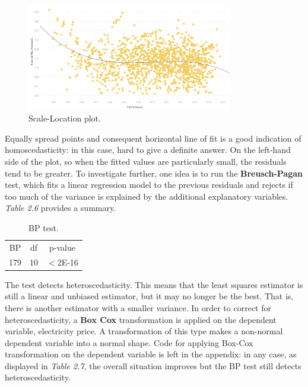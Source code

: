 \documentclass{book}
\begin{document}
\bigskip
\begin{figure}[H]
\begin{center}
\captionsetup{justification=centering}
\includegraphics[width=0.8\textwidth]{Images/scalelog.png}
\caption{Scale-Location plot.}
\end{center}
\end{figure}
\bigskip

Equally spread points and consequent horizontal line of fit is a good indication of homoscedasticity: in this case, hard to give a definite answer. On the left-hand side of the plot, so when the fitted values are particularly small, the residuals tend to be greater. To investigate further, one idea is to run the \textbf{Breusch-Pagan} test, which fits a linear regression model to the previous residuals and rejects if too much of the variance is explained by the additional explanatory variables. \textit{Table 2.6} provides a summary.

\bigskip
\begin{table}[H]
\begin{center}
\begin{tabular}{|c|c|c|}
\hline
\rowcolor{lightgray} \multicolumn{3}{|c|}{BP Test}\\
\hline
BP&df&p-value\\
179&10&$<$2E-16\\
\hline
\end{tabular}
\caption{BP test.}
\end{center}
\end{table}
\bigskip

The test detects heteroscedasticity. This means that the least squares estimator is still a linear and unbiased estimator, but it may no longer be the best. That is, there is another estimator with a smaller variance. In order to correct for heteroscedasticity, a \textbf{Box Cox} transformation is applied on the dependent variable, electricity price. A transformation of this type makes a non-normal dependent variable into a normal shape. \cite{box1964analysis} Code for applying Box-Cox transformation on the dependent variable is left in the appendix: in any case, as displayed in \textit{Table 2.7}, the overall situation improves but the BP test still detects heteroscedasticity.
\end{document}
